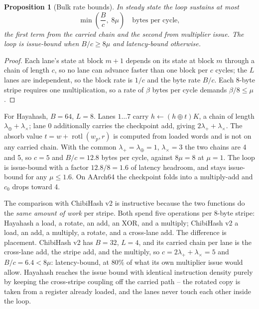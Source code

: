 \documentclass[10pt,a4paper]{article}
\newtheorem{proposition}{Proposition}
\theoremstyle{remark}
\newcommand{\rotl}{\operatorname{rotl}}
\begin{document}
\begin{proposition}[Bulk rate bounds]
\label{prop:cost}
In steady state the loop sustains at most
\[
  \min\!\left(\frac{B}{c},\; 8\mu\right) \quad\text{bytes per cycle},
\]
the first term from the carried chain and the second from multiplier issue.
The loop is issue-bound when \(B/c \ge 8\mu\) and latency-bound otherwise.
\end{proposition}

\begin{proof}
Each lane's state at block \(m+1\) depends on its state at block \(m\)
through a chain of length \(c\), so no lane can advance faster than one block
per \(c\) cycles; the \(L\) lanes are independent, so the block rate is
\(1/c\) and the byte rate \(B/c\).  Each 8-byte stripe requires one
multiplication, so a rate of \(\beta\) bytes per cycle demands
\(\beta/8 \le \mu\).
\end{proof}

For Hayahash, \(B = 64\), \(L = 8\).  Lanes \(1\ldots7\) carry
\(h \leftarrow (h \oplus t)K\), a chain of length
\(\lambda_\oplus + \lambda_\times\); lane 0 additionally carries the
checkpoint add, giving \(2\lambda_+ + \lambda_\times\).  The absorb value
\(t = w + \rotl(w_p,r)\) is computed from loaded words and is not on any
carried chain.  With the common \(\lambda_+ = \lambda_\oplus = 1\),
\(\lambda_\times = 3\) the two chains are 4 and 5, so \(c = 5\) and
\(B/c = 12.8\) bytes per cycle, against \(8\mu = 8\) at \(\mu = 1\).  The loop is issue-bound with a factor
\(12.8/8 = 1.6\) of latency headroom, and stays issue-bound for any
\(\mu \le 1.6\).  On AArch64 the checkpoint folds into a multiply-add and
\(c_0\) drops toward 4.

The comparison with ChibiHash v2 is instructive because the two functions do
the \emph{same amount of work} per stripe.  Both spend five operations per
8-byte stripe: Hayahash a load, a rotate, an add, an XOR, and a multiply;
ChibiHash v2 a load, an add, a multiply, a rotate, and a cross-lane add.  The
difference is placement.  ChibiHash v2 has \(B = 32\), \(L = 4\), and its
carried chain per lane is the cross-lane add, the stripe add, and the
multiply, so \(c = 2\lambda_+ + \lambda_\times = 5\) and
\(B/c = 6.4 < 8\mu\): latency-bound, at 80\% of what its own multiplier issue
would allow.  Hayahash reaches the issue bound with identical instruction
density purely by keeping the cross-stripe coupling off the carried path --
the rotated copy is taken from a register already loaded, and the lanes never
touch each other inside the loop.
\end{document}
